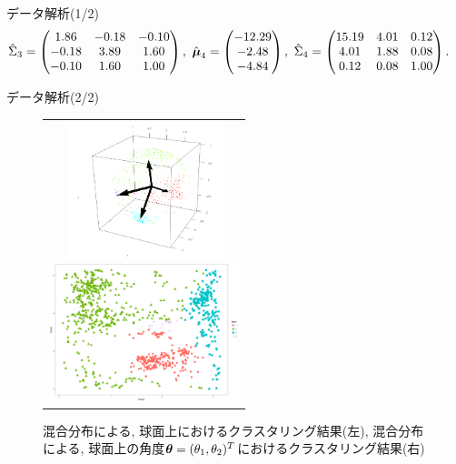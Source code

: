 \documentclass[dvipdfmx]{beamer} %
\newcommand{\bm}[1]{\mbox{\boldmath $#1$}}
\begin{document}
\begin{frame}{データ解析(1/2)}
\begin{equation}
\begin{split}
&\hat \Sigma_3 = \begin{pmatrix}  1.86  & -0.18 &  -0.10 \\-0.18 & 3.89 & 1.60 \\  -0.10 & 1.60 & 1.00 \\ \end{pmatrix},\ 
\hat{\bm \mu}_4 = \begin{pmatrix} -12.29   \\ -2.48 \\ -4.84 \\ \end{pmatrix},\ 
\hat \Sigma_4 = \begin{pmatrix} 15.19 & 4.01 &  0.12 \\ 4.01 & 1.88 & 0.08 \\ 0.12 & 0.08 &1.00 \\ \end{pmatrix}.
\end{split}
\end{equation}
\normalsize
\end{frame}


\begin{frame}{データ解析(2/2)}

\vspace{-1zh}
\begin{figure}[H]
\begin{tabular}{c}

\begin{minipage}{0.5\hsize}
\begin{center}
\includegraphics[clip,height= 40mm]{data/cluster_3d.png}
\end{center}
\end{minipage}

\begin{minipage}{0.5\hsize}
\begin{center}
\includegraphics[clip,height= 40mm]{data/cluster_4.png}
\end{center}
\end{minipage}

\end{tabular}
\label{fig2}
\caption{混合分布による, 球面上におけるクラスタリング結果(左), 混合分布による, 球面上の角度$\bm \theta = (\theta_1, \theta_2)^T$におけるクラスタリング結果(右)}
\end{figure}
\end{frame}
\end{document}
